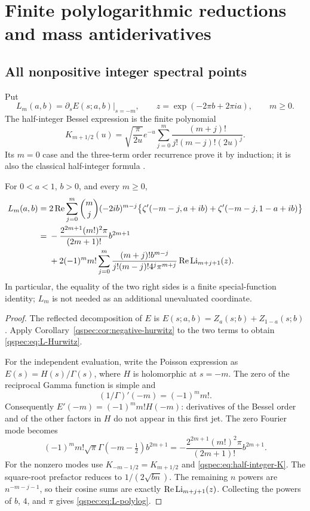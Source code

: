 \section{Finite polylogarithmic reductions and mass antiderivatives}
\label{qspec:sec:finite}

\subsection{All nonpositive integer spectral points}
Put
\begin{equation}\label{qspec:eq:Lm}
L_m(a,b)=\left.\partial_s E(s;a,b)\right|_{s=-m},\qquad
z=\exp(-2\pi b+2\pi ia),\qquad m\ge0.
\end{equation}
The half-integer Bessel expression is the finite polynomial
\begin{equation}\label{qspec:eq:half-integer-K}
K_{m+1/2}(u)=\sqrt{\frac\pi{2u}}e^{-u}
\sum_{j=0}^m\frac{(m+j)!}{j!(m-j)!(2u)^j}.
\end{equation}
Its $m=0$ case and the three-term order recurrence prove it by induction;
it is also the classical half-integer formula \cite{halfK}.

\begin{theorem}
\label{qspec:thm:finite}
For $0<a<1$, $b>0$, and every $m\ge0$,
\begin{align}
L_m(a,b)={}&2\operatorname{Re}\sum_{j=0}^m\binom mj(-2ib)^{m-j}
\bigl\{\zeta'(-m-j,a+ib)+\zeta'(-m-j,1-a+ib)\bigr\}\label{qspec:eq:L-Hurwitz}\\
={}&-\frac{2^{2m+1}(m!)^2\pi}{(2m+1)!}b^{2m+1}\notag\\
&+2(-1)^mm!\sum_{j=0}^m
\frac{(m+j)!b^{m-j}}{j!(m-j)!4^j\pi^{m+j}}
\operatorname{Re}\operatorname{Li}_{m+j+1}(z).
\label{qspec:eq:L-polylog}
\end{align}
In particular, the equality of the two right sides is a finite special-function
identity; $L_m$ is not needed as an additional unevaluated coordinate.
\end{theorem}
\begin{proof}
The reflected decomposition of $E$ is
$E(s;a,b)=Z_a(s;b)+Z_{1-a}(s;b)$. Apply
Corollary~\ref{qspec:cor:negative-hurwitz} to the two terms to obtain
\eqref{qspec:eq:L-Hurwitz}.

For the independent evaluation, write the Poisson expression as
$E(s)=H(s)/\Gamma(s)$, where $H$ is holomorphic at $s=-m$. The zero
of the reciprocal Gamma function is simple and
\[
(1/\Gamma)'(-m)=(-1)^mm!.
\]
Consequently $E'(-m)=(-1)^mm!H(-m)$: derivatives of the Bessel order
and of the other factors in $H$ do not appear in this first jet. The
zero Fourier mode becomes
\[
(-1)^mm!\sqrt\pi\Gamma(-m-\tfrac12)b^{2m+1}
=-\frac{2^{2m+1}(m!)^2\pi}{(2m+1)!}b^{2m+1}.
\]
For the nonzero modes use $K_{-m-1/2}=K_{m+1/2}$ and
\eqref{qspec:eq:half-integer-K}. The square-root prefactor reduces to
$1/(2\sqrt{bn})$. The remaining $n$ powers are
$n^{-m-j-1}$, so their cosine sums are exactly
$\operatorname{Re}\operatorname{Li}_{m+j+1}(z)$. Collecting the powers of $b$, $4$, and $\pi$
gives \eqref{qspec:eq:L-polylog}.
\end{proof}

